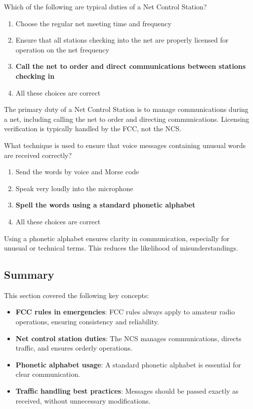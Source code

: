 
\begin{tcolorbox}[colback=gray!10!white,colframe=black!75!black,title={T2C02}]
    Which of the following are typical duties of a Net Control Station?
    \begin{enumerate}[label=\Alph*),noitemsep]
        \item Choose the regular net meeting time and frequency
        \item Ensure that all stations checking into the net are properly licensed for operation on the net frequency
        \item \textbf{Call the net to order and direct communications between stations checking in}
        \item All these choices are correct
    \end{enumerate}
\end{tcolorbox}
The primary duty of a Net Control Station is to manage communications during a net, including calling the net to order and directing communications. Licensing verification is typically handled by the FCC, not the NCS.


\begin{tcolorbox}[colback=gray!10!white,colframe=black!75!black,title={T2C03}]
    What technique is used to ensure that voice messages containing unusual words are received correctly?
    \begin{enumerate}[label=\Alph*),noitemsep]
        \item Send the words by voice and Morse code
        \item Speak very loudly into the microphone
        \item \textbf{Spell the words using a standard phonetic alphabet}
        \item All these choices are correct
    \end{enumerate}
\end{tcolorbox}
Using a phonetic alphabet ensures clarity in communication, especially for unusual or technical terms. This reduces the likelihood of misunderstandings.


\subsection*{Summary}
This section covered the following key concepts:
\begin{itemize}
    \item \textbf{FCC rules in emergencies}: FCC rules always apply to amateur radio operations, ensuring consistency and reliability.
    \item \textbf{Net control station duties}: The NCS manages communications, directs traffic, and ensures orderly operations.
    \item \textbf{Phonetic alphabet usage}: A standard phonetic alphabet is essential for clear communication.
    \item \textbf{Traffic handling best practices}: Messages should be passed exactly as received, without unnecessary modifications.
\end{itemize}
